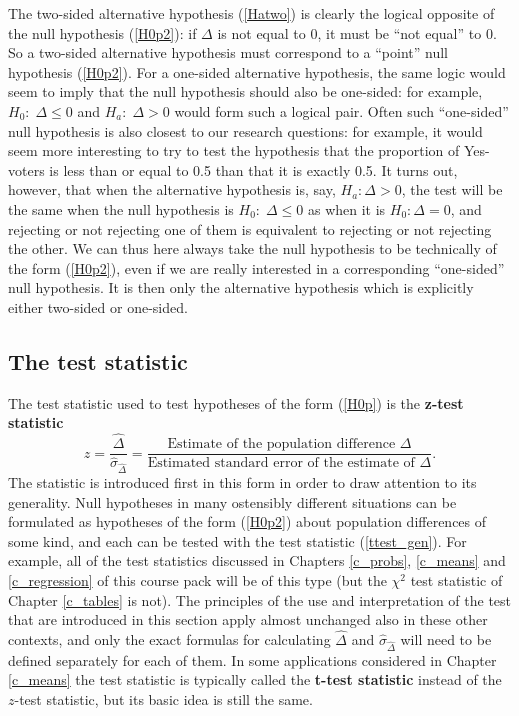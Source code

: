 \label{p_onesidednull}
The two-sided alternative hypothesis (\ref{Hatwo}) is clearly the
logical opposite of the null hypothesis (\ref{H0p2}): if $\Delta$ is not
equal to 0, it must be ``not equal'' to 0. So a two-sided alternative
hypothesis must correspond to a ``point'' null hypothesis (\ref{H0p2}).
For a one-sided alternative hypothesis, the same logic would seem to
imply that the null hypothesis should also be one-sided: for example,
$H_{0}: \; \Delta\le 0$ and $H_{a}:\; \Delta>0$ would form such a
logical pair. Often such ``one-sided'' null hypothesis is also closest
to our research questions: for example, it would seem more interesting
to try to test the hypothesis that the proportion of Yes-voters is less
than or equal to 0.5 than that it is exactly 0.5.
It turns out, however, that when the
alternative hypothesis is, say, $H_{a}: \Delta>0$, the test will be the
same when the null hypothesis is $H_{0}: \; \Delta\le 0$ as when it is
$H_{0}: \Delta= 0$, and rejecting or not rejecting one of them is
equivalent to rejecting or not rejecting the other. We can thus here
always take the null hypothesis to be technically of the form
(\ref{H0p2}), even if we are really interested in a corresponding
``one-sided'' null hypothesis. It is then only the alternative
hypothesis which is explicitly either two-sided or one-sided.

\subsection{The test statistic}
\label{ss_probs_test1sample_teststatistic}

The test statistic used to test hypotheses of the form (\ref{H0p}) is
the \textbf{z-test statistic}
\begin{equation}
z=
\frac{\hat{\Delta}}{\hat{\sigma}_{\hat{\Delta}}}=
\frac{\text{Estimate of the population difference $\Delta$}}
{\text{Estimated standard error
of the estimate of $\Delta$}}.
\label{ttest_gen}
\end{equation}
The statistic is introduced first in this form
in order to draw attention to its generality.
Null hypotheses in many ostensibly different
situations can be formulated as hypotheses of the form
(\ref{H0p2}) about
population differences of some kind, and each can be tested with the test
statistic (\ref{ttest_gen}). For example, all of the test
statistics discussed in Chapters \ref{c_probs}, \ref{c_means} and
\ref{c_regression} of this course pack will be of this type (but the
$\chi^{2}$ test statistic of Chapter \ref{c_tables} is not). The
principles of the use and interpretation of the test that are introduced
in this section apply almost unchanged also in these other contexts, and
only the exact formulas for calculating $\hat{\Delta}$ and
$\hat{\sigma}_{\hat{\Delta}}$ will need to be defined separately for
each of them. In some applications considered in Chapter \ref{c_means}
the test statistic is typically called the \textbf{t-test statistic}
instead of the $z$-test statistic, but its basic idea is still the same.

